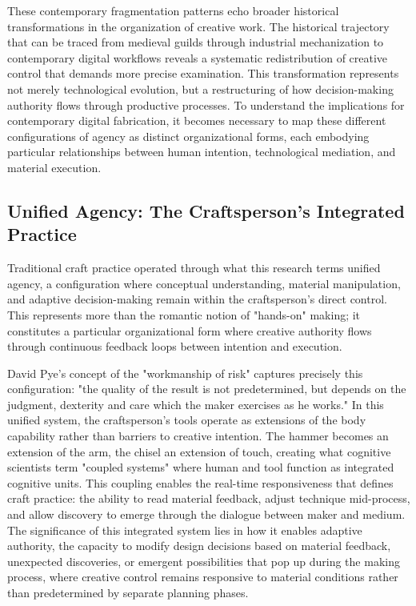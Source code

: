 These contemporary fragmentation patterns echo broader historical transformations in the organization of creative work. The historical trajectory that can be traced from medieval guilds through industrial mechanization to contemporary digital workflows reveals a systematic redistribution of creative control that demands more precise examination. This transformation represents not merely technological evolution, but a restructuring of how decision-making authority flows through productive processes. To understand the implications for contemporary digital fabrication, it becomes necessary to map these different configurations of agency as distinct organizational forms, each embodying particular relationships between human intention, technological mediation, and material execution.

\subsection{Unified Agency: The Craftsperson's Integrated Practice}

Traditional craft practice operated through what this research terms unified agency, a configuration where conceptual understanding, material manipulation, and adaptive decision-making remain within the craftsperson's direct control. This represents more than the romantic notion of "hands-on" making; it constitutes a particular organizational form where creative authority flows through continuous feedback loops between intention and execution.

David Pye's concept of the "workmanship of risk" captures precisely this configuration: "the quality of the result is not predetermined, but depends on the judgment, dexterity and care which the maker exercises as he works." In this unified system, the craftsperson's tools operate as extensions of the body capability rather than barriers to creative intention. The hammer becomes an extension of the arm, the chisel an extension of touch, creating what cognitive scientists term "coupled systems" where human and tool function as integrated cognitive units. This coupling enables the real-time responsiveness that defines craft practice: the ability to read material feedback, adjust technique mid-process, and allow discovery to emerge through the dialogue between maker and medium. The significance of this integrated system lies in how it enables adaptive authority, the capacity to modify design decisions based on material feedback, unexpected discoveries, or emergent possibilities that pop up during the making process, where creative control remains responsive to material conditions rather than predetermined by separate planning phases.


